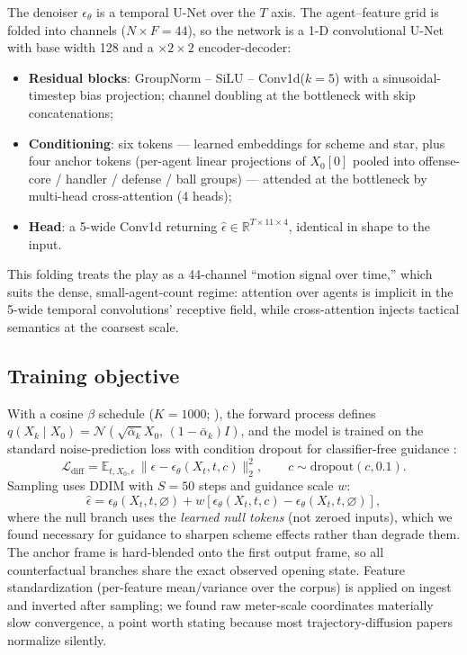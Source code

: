 \documentclass[11pt]{article}
\newcommand{\R}{\mathbb{R}}
\newcommand{\E}{\mathbb{E}}
\newcommand{\loss}{\mathcal{L}}
\begin{document}
The denoiser $\epsilon_\theta$ is a temporal U-Net over the $T$ axis. The
agent--feature grid is folded into channels ($N \times F = 44$), so the
network is a 1-D convolutional U-Net with base width 128 and a
$\times 2 \times 2$ encoder-decoder:
\begin{itemize}[leftmargin=*,itemsep=1pt]
\item \textbf{Residual blocks}: GroupNorm -- SiLU -- Conv1d($k{=}5$) with a
  sinusoidal-timestep bias projection; channel doubling at the bottleneck
  with skip concatenations;
\item \textbf{Conditioning}: six tokens --- learned embeddings for scheme and
  star, plus four anchor tokens (per-agent linear projections of $X_0[0]$
  pooled into offense-core / handler / defense / ball groups) --- attended at
  the bottleneck by multi-head cross-attention (4 heads);
\item \textbf{Head}: a 5-wide Conv1d returning $\hat\epsilon \in
  \R^{T \times 11 \times 4}$, identical in shape to the input.
\end{itemize}
This folding treats the play as a 44-channel ``motion signal over time,''
which suits the dense, small-agent-count regime: attention over agents is
implicit in the 5-wide temporal convolutions' receptive field, while
cross-attention injects tactical semantics at the coarsest scale.

\subsection{Training objective}
\label{sec:training}

With a cosine $\beta$ schedule ($K{=}1000$; \citealp{nichol2021improved}),
the forward process defines
$q(X_k \mid X_0) = \mathcal{N}\!\left(\sqrt{\bar\alpha_k} X_0,\,
(1 - \bar\alpha_k) I\right)$, and the model is trained on the standard
noise-prediction loss with condition dropout for classifier-free guidance
\citep{ho2022cfg}:
\begin{equation}
\loss_{\text{diff}} = \E_{t, X_0, \epsilon}\,
\big\| \epsilon - \epsilon_\theta(X_t, t, c) \big\|_2^2,
\qquad c \sim \text{dropout}(c, 0.1).
\label{eq:diff}
\end{equation}
Sampling uses DDIM \citep{song2021ddim} with $S{=}50$ steps and guidance
scale $w$:
\begin{equation}
\hat\epsilon = \epsilon_\theta(X_t, t, \varnothing)
+ w \left[ \epsilon_\theta(X_t, t, c) - \epsilon_\theta(X_t, t, \varnothing) \right],
\end{equation}
where the null branch uses the \emph{learned null tokens} (not zeroed
inputs), which we found necessary for guidance to sharpen scheme effects
rather than degrade them. The anchor frame is hard-blended onto the first
output frame, so all counterfactual branches share the exact observed opening
state. Feature standardization (per-feature mean/variance over the corpus)
is applied on ingest and inverted after sampling; we found raw meter-scale
coordinates materially slow convergence, a point worth stating because most
trajectory-diffusion papers normalize silently.
\end{document}

